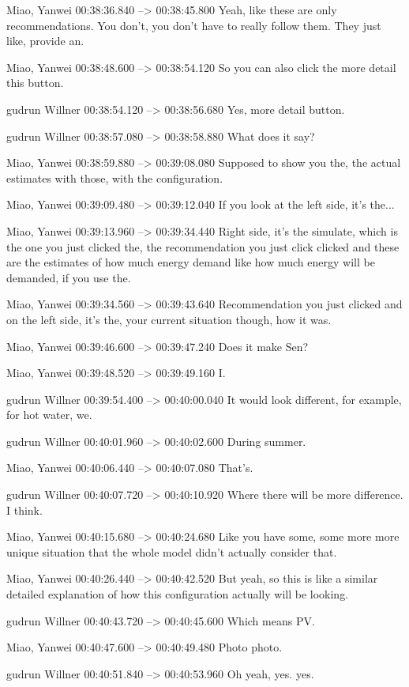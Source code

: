 {Miao, Yanwei 00:38:36.840 --> 00:38:45.800
Yeah, like these are only recommendations. You don't, you don't have to really follow them. They just like, provide an.

Miao, Yanwei 00:38:48.600 --> 00:38:54.120
So you can also click the more detail this button.

gudrun Willner 00:38:54.120 --> 00:38:56.680
Yes, more detail button.

gudrun Willner 00:38:57.080 --> 00:38:58.880
What does it say?

Miao, Yanwei 00:38:59.880 --> 00:39:08.080
Supposed to show you the, the actual estimates with those, with the configuration.

Miao, Yanwei 00:39:09.480 --> 00:39:12.040
If you look at the left side, it's the...

Miao, Yanwei 00:39:13.960 --> 00:39:34.440
Right side, it's the simulate, which is the one you just clicked the, the recommendation you just click clicked and these are the estimates of how much energy demand like how much energy will be demanded, if you use the.

Miao, Yanwei 00:39:34.560 --> 00:39:43.640
Recommendation you just clicked and on the left side, it's the, your current situation though, how it was.

Miao, Yanwei 00:39:46.600 --> 00:39:47.240
Does it make Sen?

Miao, Yanwei 00:39:48.520 --> 00:39:49.160
I.

gudrun Willner 00:39:54.400 --> 00:40:00.040
It would look different, for example, for hot water, we.

gudrun Willner 00:40:01.960 --> 00:40:02.600
During summer.

Miao, Yanwei 00:40:06.440 --> 00:40:07.080
That's.

gudrun Willner 00:40:07.720 --> 00:40:10.920
Where there will be more difference. I think.

Miao, Yanwei 00:40:15.680 --> 00:40:24.680
Like you have some, some more more unique situation that the whole model didn't actually consider that.

Miao, Yanwei 00:40:26.440 --> 00:40:42.520
But yeah, so this is like a similar detailed explanation of how this configuration actually will be looking.

gudrun Willner 00:40:43.720 --> 00:40:45.600
Which means PV.

Miao, Yanwei 00:40:47.600 --> 00:40:49.480
Photo photo.

gudrun Willner 00:40:51.840 --> 00:40:53.960
Oh yeah, yes. yes.

}
